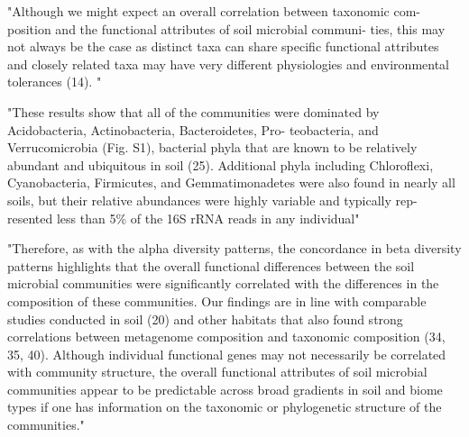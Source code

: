 "Although we might expect an overall correlation between taxonomic com- position and the functional attributes of soil microbial communi- ties, this may not always be the case as distinct taxa can share specific functional attributes and closely related taxa may have very different physiologies and environmental tolerances (14). "\cite{Fierer_2012}

"These results show that all of the communities were dominated by Acidobacteria, Actinobacteria, Bacteroidetes, Pro- teobacteria, and Verrucomicrobia (Fig. S1), bacterial phyla that are known to be relatively abundant and ubiquitous in soil (25). Additional phyla including Chloroflexi, Cyanobacteria, Firmicutes, and Gemmatimonadetes were also found in nearly all soils, but their relative abundances were highly variable and typically rep- resented less than 5\% of the 16S rRNA reads in any individual"\cite{Fierer_2012}

"Therefore, as with the alpha diversity patterns, the concordance in beta diversity patterns highlights that the overall functional differences between the soil microbial communities were significantly correlated with the differences in the composition of these communities. Our findings are in line with comparable studies conducted in soil (20) and other habitats that also found strong correlations between metagenome composition and taxonomic composition (34, 35, 40). Although individual functional genes may not necessarily be correlated with community structure, the overall functional attributes of soil microbial communities appear to be predictable across broad gradients in soil and biome types if one has information on the taxonomic or phylogenetic structure of the communities."\cite{Fierer_2012}
